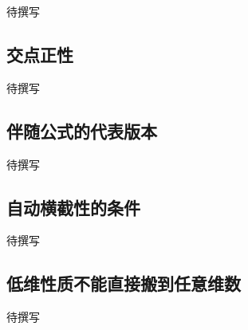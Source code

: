 
% 
% 
% 


待撰写

\subsection{交点正性}
\label{g4:subsec:2307:01}
待撰写

\subsection{伴随公式的代表版本}
\label{g4:subsec:2307:02}
待撰写

\subsection{自动横截性的条件}
\label{g4:subsec:2307:03}
待撰写

\subsection{低维性质不能直接搬到任意维数}
\label{g4:subsec:2307:04}
待撰写
